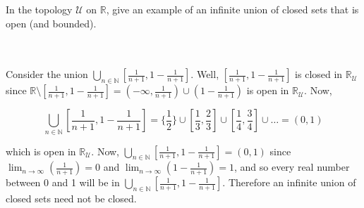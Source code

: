 In the topology $\mathcal{U}$ on $\mathbb{R}$, give an example of an infinite union of closed sets that
is open (and bounded).\\\\

\begin{solution}\renewcommand{\qedsymbol}{}\ \\
    Consider the union $\bigcup_{n\in\mathbb{N}}[\frac{1}{n+1},1-\frac{1}{n+1}]$. Well,
    $[\frac{1}{n+1},1-\frac{1}{n+1}]$ is closed in $\mathbb{R}_{\mathcal{U}}$ since
    $\mathbb{R}\setminus[\frac{1}{n+1},1-\frac{1}{n+1}]=(-\infty,\frac{1}{n+1})\cup(1-\frac{1}{n+1})$ is
    open in $\mathbb{R}_{\mathcal{U}}$. Now,

    $$\bigcup_{n\in\mathbb{N}}[\frac{1}{n+1},1-\frac{1}{n+1}]=\{\frac12\}\cup[\frac13,\frac23]
    \cup[\frac14,\frac34]\cup\ldots=(0,1)$$
    
    which is open in $\mathbb{R}_{\mathcal{U}}$. Now,
    $\bigcup_{n\in\mathbb{N}}[\frac{1}{n+1},1-\frac{1}{n+1}]=(0,1)$ since
    $\lim_{n\rightarrow\infty}(\frac{1}{n+1})=0$ and $\lim_{n\rightarrow\infty}(1-\frac{1}{n+1})=1$, and
    so every real number between 0 and 1 will be in
    $\bigcup_{n\in\mathbb{N}}[\frac{1}{n+1},1-\frac{1}{n+1}]$. Therefore an infinite union of closed
    sets need not be closed.

\end{solution}